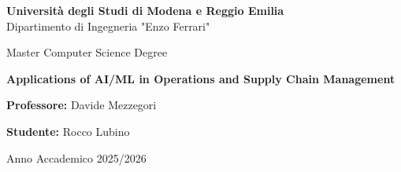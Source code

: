 \documentclass[11pt,a4paper,oneside,openany]{book}
\begin{document}
\begin{titlepage}
  \begin{center}
  
      {\Large \textbf{Università degli Studi di Modena e Reggio Emilia}} \\[2mm]
      {\large Dipartimento di Ingegneria "Enzo Ferrari"} \\[15mm]
  
  
      
      {\large Master Computer Science Degree} \\
      
        \vspace{0.5cm}
      
      {\huge \textbf{Applications of AI/ML in Operations and Supply Chain Management}} \\

  
  
      \begin{flushleft}
          \textbf{Professore:} Davide Mezzegori \\[5mm]
      \end{flushleft}
  
      \vspace{1.2cm}
  
      \begin{flushright}
          \textbf{Studente:} Rocco Lubino \\
      \end{flushright}
  
      \vspace{2cm}
      {\large Anno Accademico 2025/2026}
  
  \end{center}
\end{titlepage}

  

\restoregeometry

\tableofcontents
\clearpage














\end{document}
